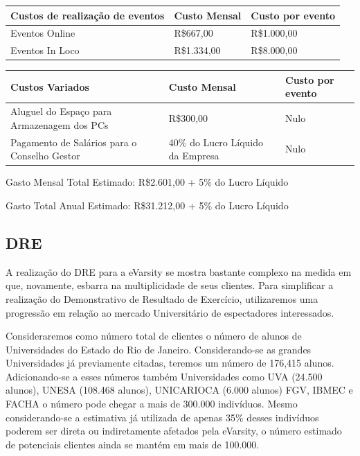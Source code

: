 \documentclass[a4paper, 12pt]{paper}
\begin{document}
\begin{table}[ht]
	\centering
	\begin{tabular}{p{6cm}p{7cm}p{2cm}}
		\hline
		\cellcolor{gray}Custos de realização de eventos&\cellcolor{gray}Custo Mensal&\cellcolor{gray}Custo por evento\\
		\hline
		Eventos Online&R\$667,00&R\$1.000,00 \\
		Eventos In Loco&R\$1.334,00&R\$8.000,00 \\
		\hline
	\end{tabular}
\end{table}

\begin{table}[ht]
	\centering
	\begin{tabular}{p{6cm}p{7cm}p{2cm}}
		\hline
		\cellcolor{gray}Custos Variados&\cellcolor{gray}Custo Mensal&\cellcolor{gray}Custo por evento\\
		\hline
		Aluguel do Espaço para Armazenagem dos PCs&R\$300,00&Nulo  \\
		Pagamento de Salários para o Conselho Gestor& 40\% do Lucro Líquido da Empresa&Nulo \\
		\hline
	\end{tabular}
\end{table}
\newpage
Gasto Mensal Total Estimado: R\$2.601,00 + 5\% do Lucro Líquido

Gasto Total Anual Estimado: R\$31.212,00 + 5\% do Lucro Líquido

\subsection{DRE}
A realização do DRE para a eVarsity se mostra bastante complexo na medida em que, novamente, esbarra na multiplicidade de seus clientes. Para simplificar a realização do Demonstrativo de Resultado de Exercício, utilizaremos uma progressão em relação ao mercado Universitário de espectadores interessados.

Consideraremos como número total de clientes o número de alunos de Universidades do Estado do Rio de Janeiro. Considerando-se as grandes Universidades já previamente citadas, teremos um número de 176,415 alunos. Adicionando-se a esses números também Universidades como UVA (24.500 alunos), UNESA (108.468 alunos), UNICARIOCA (6.000 alunos) FGV, IBMEC e FACHA o número pode chegar a mais de 300.000 indivíduos. Mesmo considerando-se a estimativa já utilizada de apenas 35\% desses indivíduos poderem ser direta ou indiretamente afetados pela eVarsity, o número estimado de potenciais clientes ainda se mantém em mais de 100.000.
\end{document}
